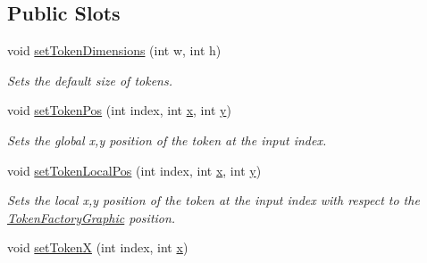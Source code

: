 \subsection*{Public Slots}
\begin{DoxyCompactItemize}
\item 
\hypertarget{class_picto_1_1_token_factory_graphic_acddff28a01a369112659a27bf601c70c}{void \hyperlink{class_picto_1_1_token_factory_graphic_acddff28a01a369112659a27bf601c70c}{set\-Token\-Dimensions} (int w, int h)}\label{class_picto_1_1_token_factory_graphic_acddff28a01a369112659a27bf601c70c}

\begin{DoxyCompactList}\small\item\em Sets the default size of tokens. \end{DoxyCompactList}\item 
\hypertarget{class_picto_1_1_token_factory_graphic_a2bac8ea9e18e10ef681ed778f19b2559}{void \hyperlink{class_picto_1_1_token_factory_graphic_a2bac8ea9e18e10ef681ed778f19b2559}{set\-Token\-Pos} (int index, int \hyperlink{struct_picto_1_1_visual_element_a1b50bc5fa41868f661687015be3c97e8}{x}, int \hyperlink{struct_picto_1_1_visual_element_a9a4db3430219e1f78208eda1a89e9f38}{y})}\label{class_picto_1_1_token_factory_graphic_a2bac8ea9e18e10ef681ed778f19b2559}

\begin{DoxyCompactList}\small\item\em Sets the global x,y position of the token at the input index. \end{DoxyCompactList}\item 
\hypertarget{class_picto_1_1_token_factory_graphic_a94c35d594298cb4480021f3956533c57}{void \hyperlink{class_picto_1_1_token_factory_graphic_a94c35d594298cb4480021f3956533c57}{set\-Token\-Local\-Pos} (int index, int \hyperlink{struct_picto_1_1_visual_element_a1b50bc5fa41868f661687015be3c97e8}{x}, int \hyperlink{struct_picto_1_1_visual_element_a9a4db3430219e1f78208eda1a89e9f38}{y})}\label{class_picto_1_1_token_factory_graphic_a94c35d594298cb4480021f3956533c57}

\begin{DoxyCompactList}\small\item\em Sets the local x,y position of the token at the input index with respect to the \hyperlink{class_picto_1_1_token_factory_graphic}{Token\-Factory\-Graphic} position. \end{DoxyCompactList}\item 
\hypertarget{class_picto_1_1_token_factory_graphic_a742e907ecde1cb4127455733578e1fa6}{void \hyperlink{class_picto_1_1_token_factory_graphic_a742e907ecde1cb4127455733578e1fa6}{set\-Token\-X} (int index, int \hyperlink{struct_picto_1_1_visual_element_a1b50bc5fa41868f661687015be3c97e8}{x})}\label{class_picto_1_1_token_factory_graphic_a742e907ecde1cb4127455733578e1fa6}


\end{DoxyCompactItemize}
